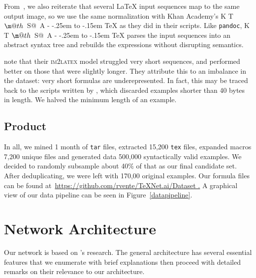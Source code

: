 \documentclass[12pt]{article}
\makeatletter
\DeclareRobustCommand{\KaTeX}{K%
  {%
    \setbox0\hbox{T}%
    \setbox\@tempboxa\hbox{$\m@th$%
      \csname S@\f@size\endcsname
      \fontsize\sf@size\z@
      \math@fontsfalse\selectfont
      A}%
    \@tempdima\ht0
    \advance\@tempdima-\ht\@tempboxa
    \@tempdima\strip@pt\fontdimen1\font\@tempdima
    \advance\@tempdima-.25em
    \kern\@tempdima
    \vbox to\ht0{\box\@tempboxa
      \vss}%
  }%
  \kern-.15em
  \TeX}
\makeatother
\begin{document}
From~\citeauthor{deng2016you}, we also reiterate that several \LaTeX{} input sequences
map to the same output image, so we use the same normalization with Khan
Academy's \KaTeX{} as they did in their scripts. Like \texttt{pandoc}, \KaTeX{}
parses the input sequences into an abstract syntax tree and rebuilds the
expressions without disrupting
semantics. 

\citeauthor[5]{bender2019learning} note that their \textsc{im2latex} model struggled
very short sequences, and performed better on those that were slightly longer.
They attribute this to an imbalance in the dataset: very short formulas are
underepresented. In fact, this may be traced back to the scripts written by
\cite{deng2016you}, which discarded examples shorter than 40 bytes in length. We
halved the minimum length of an example.

\subsection{Product}

In all, we mined 1 month of \texttt{tar} files, extracted 15,200 \texttt{tex}
files, expanded macros 7,200 unique files and generated data 500,000
syntactically valid examples. We decided to randomly subsample about 40\% of
that as our final candidate set. After deduplicating, we were left with 170,00
original examples. Our formula files can be found
at~\url{https://github.com/rvente/TeXNet.ai/Dataset .} A graphical view of our
data pipeline can be seen in Figure~\ref{datapipeline}.

\section{Network Architecture}

Our network is based on \citeauthor{singh2018teaching}'s research. The general
architecture has several essential features that we enumerate with brief
explanations then proceed with detailed remarks on their relevance to our
architecture.
\end{document}
